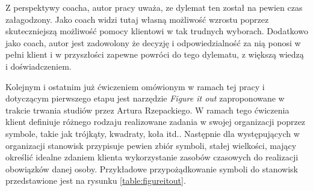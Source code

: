 Z perspektywy coacha, autor pracy uważa, ze dylemat ten został na pewien czas załagodzony. Jako coach widzi tutaj własną możliwość wzrostu poprzez
skuteczniejszą możliwość pomocy klientowi w tak trudnych wyborach. Dodatkowo jako coach, autor jest zadowolony że decyzję i odpowiedzialność za nią
ponosi w pełni klient i w przyszłości zapewne powróci do tego dylematu, z większą wiedzą i doświadczeniem.

Kolejnym i ostatnim już ćwiczeniem omówionym w ramach tej pracy i dotyczącym pierwszego etapu jest narzędzie \emph{Figure it out} zaproponowane
w trakcie trwania studiów przez Artura Rzepackiego. W ramach tego ćwiczenia klient definiuje różnego rodzaju realizowane zadania w swojej
organizacji poprzez symbole, takie jak trójkąty, kwadraty, koła itd.. Następnie dla występujących w organizacji stanowisk przypisuje pewien
zbiór symboli, stałej wielkości, mający określić idealne zdaniem klienta wykorzystanie zasobów czasowych do realizacji obowiązków danej osoby.
Przykładowe przypożądkowanie symboli do stanowisk przedstawione jest na rysunku \ref{table:figureitout}.

